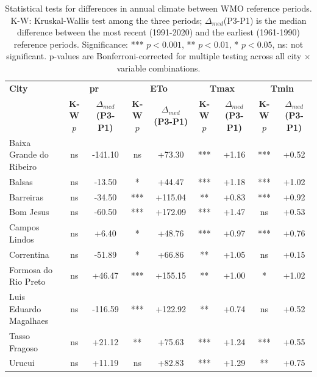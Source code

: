 \begin{table}[H]
\centering
\caption{Statistical tests for differences in annual climate between WMO reference periods. K-W: Kruskal-Wallis test among the three periods; $\Delta_{med}$(P3-P1) is the median difference between the most recent (1991-2020) and the earliest (1961-1990) reference periods. Significance: *** $p<0.001$, ** $p<0.01$, * $p<0.05$, ns: not significant. p-values are Bonferroni-corrected for multiple testing across all city $\times$ variable combinations.}
\label{tab:period_comparison_tests}
\footnotesize
\begin{tabular}{lcccccccc}
\toprule
\textbf{City} & \multicolumn{2}{c}{\textbf{pr}} & \multicolumn{2}{c}{\textbf{ETo}} & \multicolumn{2}{c}{\textbf{Tmax}} & \multicolumn{2}{c}{\textbf{Tmin}} \\
 & \textbf{K-W $p$} & \textbf{$\Delta_{med}$(P3-P1)} & \textbf{K-W $p$} & \textbf{$\Delta_{med}$(P3-P1)} & \textbf{K-W $p$} & \textbf{$\Delta_{med}$(P3-P1)} & \textbf{K-W $p$} & \textbf{$\Delta_{med}$(P3-P1)} \\
\midrule
Baixa Grande do Ribeiro & ns & -141.10 & ns & +73.30 & *** & +1.16 & *** & +0.52 \\
Balsas & ns & -13.50 & * & +44.47 & *** & +1.18 & *** & +1.02 \\
Barreiras & ns & -34.50 & *** & +115.04 & ** & +0.83 & *** & +0.92 \\
Bom Jesus & ns & -60.50 & *** & +172.09 & *** & +1.47 & ns & +0.53 \\
Campos Lindos & ns & +6.40 & * & +48.76 & *** & +0.97 & *** & +0.76 \\
Correntina & ns & -51.89 & * & +66.86 & ** & +1.05 & ns & +0.15 \\
Formosa do Rio Preto & ns & +46.47 & *** & +155.15 & ** & +1.00 & * & +1.02 \\
Luis Eduardo Magalhaes & ns & -116.59 & *** & +122.92 & ** & +0.74 & ns & +0.52 \\
Tasso Fragoso & ns & +21.12 & ** & +75.63 & *** & +1.24 & *** & +0.55 \\
Urucui & ns & +11.19 & ns & +82.83 & *** & +1.29 & ** & +0.75 \\
\bottomrule
\end{tabular}
\end{table}